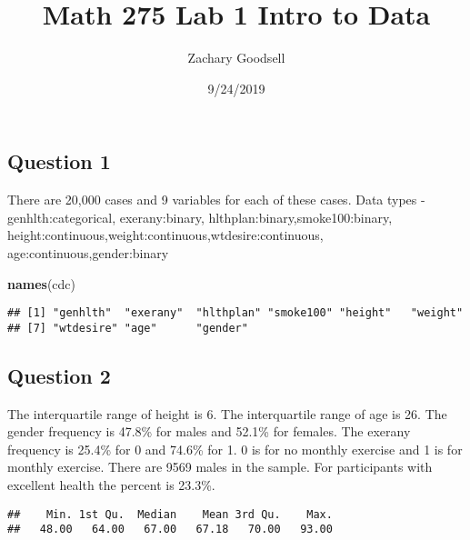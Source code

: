 \documentclass[]{article}
\title{Math 275 Lab 1 Intro to Data}
\author{Zachary Goodsell}
\date{9/24/2019}
\newenvironment{Shaded}{\begin{snugshade}}{\end{snugshade}}
\newcommand{\KeywordTok}[1]{\textcolor[rgb]{0.13,0.29,0.53}{\textbf{#1}}}
\newcommand{\NormalTok}[1]{#1}
\newcommand{\OperatorTok}[1]{\textcolor[rgb]{0.81,0.36,0.00}{\textbf{#1}}}
\begin{document}
\maketitle

\hypertarget{question-1}{%
\subsection{Question 1}\label{question-1}}

There are 20,000 cases and 9 variables for each of these cases. Data
types - genhlth:categorical, exerany:binary,
hlthplan:binary,smoke100:binary,
height:continuous,weight:continuous,wtdesire:continuous,
age:continuous,gender:binary

\begin{Shaded}
\begin{Highlighting}[]
\KeywordTok{names}\NormalTok{(cdc)}
\end{Highlighting}
\end{Shaded}

\begin{verbatim}
## [1] "genhlth"  "exerany"  "hlthplan" "smoke100" "height"   "weight"  
## [7] "wtdesire" "age"      "gender"
\end{verbatim}

\hypertarget{question-2}{%
\subsection{Question 2}\label{question-2}}

The interquartile range of height is 6. The interquartile range of age
is 26. The gender frequency is 47.8\% for males and 52.1\% for females.
The exerany frequency is 25.4\% for 0 and 74.6\% for 1. 0 is for no
monthly exercise and 1 is for monthly exercise. There are 9569 males in
the sample. For participants with excellent health the percent is
23.3\%.

\begin{Shaded}
\end{Shaded}

\begin{verbatim}
##    Min. 1st Qu.  Median    Mean 3rd Qu.    Max. 
##   48.00   64.00   67.00   67.18   70.00   93.00
\end{verbatim}

\begin{Shaded}
\end{Shaded}
\end{document}
